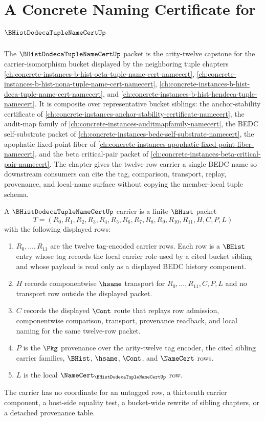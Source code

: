 \chapter{A Concrete Naming Certificate for $\BHistDodecaTupleNameCertUp$}
\label{ch:concrete-instances-b-hist-dodeca-tuple-name-cert-namecert}

The $\BHistDodecaTupleNameCertUp$ packet is the arity-twelve capstone for the carrier-isomorphism bucket displayed by the neighboring tuple chapters \autoref{ch:concrete-instances-b-hist-octa-tuple-name-cert-namecert}, \autoref{ch:concrete-instances-b-hist-nona-tuple-name-cert-namecert}, \autoref{ch:concrete-instances-b-hist-deca-tuple-name-cert-namecert}, and \autoref{ch:concrete-instances-b-hist-hendeca-tuple-namecert}. It is composite over representative bucket siblings: the anchor-stability certificate of \autoref{ch:concrete-instances-anchor-stability-certificate-namecert}, the audit-map family of \autoref{ch:concrete-instances-auditmapfamily-namecert}, the BEDC self-substrate packet of \autoref{ch:concrete-instances-bedc-self-substrate-namecert}, the apophatic fixed-point fiber of \autoref{ch:concrete-instances-apophatic-fixed-point-fiber-namecert}, and the beta critical-pair packet of \autoref{ch:concrete-instances-beta-critical-pair-namecert}. The chapter gives the twelve-row carrier a single BEDC name so downstream consumers can cite the tag, comparison, transport, replay, provenance, and local-name surface without copying the member-local tuple schema.

\begin{definition}
\label{def:b-hist-dodeca-tuple-name-cert-carrier}
A $\BHistDodecaTupleNameCertUp$ carrier is a finite $\BHist$ packet
$$
T=(R_0,R_1,R_2,R_3,R_4,R_5,R_6,R_7,R_8,R_9,R_{10},R_{11},H,C,P,L)
$$
with the following displayed rows:
\begin{enumerate}
\item $R_0,\ldots,R_{11}$ are the twelve tag-encoded carrier rows. Each row is a $\BHist$ entry whose tag records the local carrier role used by a cited bucket sibling and whose payload is read only as a displayed BEDC history component.
\item $H$ records componentwise $\hsame$ transport for $R_0,\ldots,R_{11},C,P,L$ and no transport row outside the displayed packet.
\item $C$ records the displayed $\Cont$ route that replays row admission, componentwise comparison, transport, provenance readback, and local naming for the same twelve-row packet.
\item $P$ is the $\Pkg$ provenance over the arity-twelve tag encoder, the cited sibling carrier families, $\BHist$, $\hsame$, $\Cont$, and $\NameCert$ rows.
\item $L$ is the local $\NameCert_{\BHistDodecaTupleNameCertUp}$ row.
\end{enumerate}
The carrier has no coordinate for an untagged row, a thirteenth carrier component, a host-side equality test, a bucket-wide rewrite of sibling chapters, or a detached provenance table.
\end{definition}

